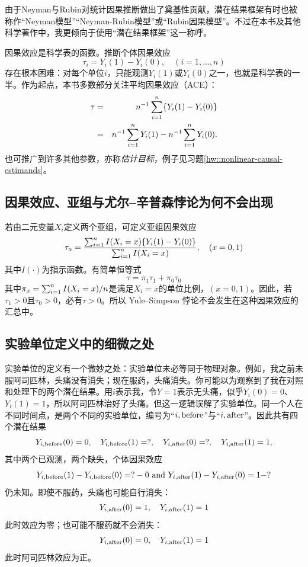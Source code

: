 由于Neyman与Rubin对统计因果推断做出了奠基性贡献，潜在结果框架有时也被称作“Neyman模型”“Neyman-Rubin模型”或“Rubin因果模型”。不过在本书及其他科学著作中，我更倾向于使用“潜在结果框架”这一称呼。 
 
 
因果效应是科学表的函数。推断个体因果效应
$$
\tau_i =  Y_i(1) - Y_i(0) ,\quad (i=1, \ldots, n)
$$
存在根本困难：对每个单位$i$，只能观测$Y_i(1)$或$Y_i(0)$之一，也就是科学表的一半。作为起点，本书多数部分关注平均因果效应（ACE）：
\begin{eqnarray*}
\tau  &=&  n^{-1} \sum_{i=1}^n \{  Y_i(1) - Y_i(0) \}  \\
&=&  n^{-1} \sum_{i=1}^n  Y_i(1) -  n^{-1} \sum_{i=1}^n  Y_i(0).
\end{eqnarray*}
也可推广到许多其他参数，亦称{\it 估计目标}，例子见习题\ref{hw::nonlinear-causal-estimands}。 


\subsection{因果效应、亚组与尤尔--辛普森悖论为何不会出现}


若由二元变量$X_i $定义两个亚组，可定义亚组因果效应
$$
\tau_x = \frac{  \sum_{i=1}^n  I(X_i = x) \{  Y_i(1) - Y_i(0) \}    }{   \sum_{i=1}^n  I(X_i = x)    },\quad (x=0,1) 
$$
其中$I(\cdot)$为指示函数。有简单恒等式
$$
\tau =  \pi_1 \tau_1  +  \pi_0 \tau_0
$$
其中$\pi_x =  \sum_{i=1}^n  I(X_i = x)  / n$是满足$X_i = x$的单位比例，$(x=0,1)$。因此，若$\tau_1  > 0$且$ \tau_0 > 0$，必有$\tau > 0$。所以 Yule--Simpson 悖论不会发生在这种因果效应的汇总中。  



\subsection{实验单位定义中的细微之处}

实验单位的定义有一个微妙之处：实验单位未必等同于物理对象。例如，我之前未服阿司匹林，头痛没有消失；现在服药，头痛消失。你可能以为观察到了我在对照和处理下的两个潜在结果。用$i$表示我，令$Y=1$表示无头痛，似乎$Y_i(0) = 0$、$Y_i(1) = 1$，所以阿司匹林治好了头痛。但这一逻辑误解了实验单位。同一个人在不同时间点，是两个不同的实验单位，编号为“$i,\textup{before}$”与“$i,\textup{after}$”。因此共有四个潜在结果
$$
Y_{i,\textup{before}}(0)=0, \quad  Y_{i,\textup{before}}(1)=?,\quad
Y_{i,\textup{after}}(0)=?, \quad  Y_{i,\textup{after}}(1)=1,
$$
其中两个已观测，两个缺失，个体因果效应
$$
Y_{i,\textup{before}}(1) -  Y_{i,\textup{before}}(0) = ? - 0 \text{ and } Y_{i,\textup{after}}(1)  - Y_{i,\textup{after}}(0) = 1 - ?
$$
仍未知。即使不服药，头痛也可能自行消失：
$$
Y_{i,\textup{after}}(0)=1, \quad  Y_{i,\textup{after}}(1)=1
$$
此时效应为零；也可能不服药就不会消失：
$$
Y_{i,\textup{after}}(0)=0, \quad  Y_{i,\textup{after}}(1)=1
$$
此时阿司匹林效应为正。 

